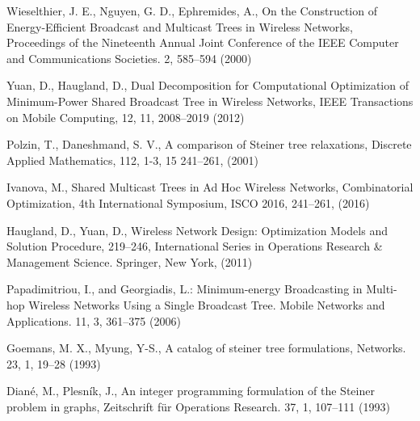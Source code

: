 \documentclass[smallextended]{svjour3}       %
\begin{document}
\begin{thebibliography}{}

%
%
Wieselthier,  J. E., Nguyen, G. D., Ephremides, A.,
On the Construction of Energy-Efficient Broadcast and Multicast Trees in Wireless Networks,
Proceedings of the Nineteenth Annual Joint Conference of the IEEE Computer and Communications Societies.
2, 585--594 (2000)

Yuan, D., Haugland, D.,
Dual Decomposition for Computational Optimization of Minimum-Power Shared Broadcast Tree in Wireless Networks,
IEEE Transactions on Mobile Computing,
12, 11, 2008--2019 (2012)

Polzin, T., Daneshmand, S. V., A comparison of Steiner tree relaxations, Discrete Applied Mathematics, 112,  1-3, 15 241--261, (2001)

Ivanova, M., Shared Multicast Trees in Ad Hoc Wireless Networks, Combinatorial Optimization, 4th International Symposium, ISCO 2016, 241--261, (2016)

Haugland, D., Yuan, D.,
Wireless Network Design: Optimization Models and Solution Procedure, 219--246,
International Series in Operations Research \& Management Science.
Springer, New York, (2011)

Papadimitriou, I., and Georgiadis, L.:
Minimum-energy Broadcasting in Multi-hop Wireless Networks Using a Single Broadcast Tree.
Mobile Networks and Applications.
11, 3, 361--375 (2006)

Goemans, M. X., Myung, Y-S.,
A catalog of steiner tree formulations, 
Networks.
23, 1, 19--28 (1993) 

Dian{\'e}, M., Plesn{\'i}k, J.,
An integer programming formulation of the Steiner problem in graphs,
Zeitschrift f{\"u}r Operations Research.
37, 1, 107--111 (1993)

\end{thebibliography}
\end{document}
